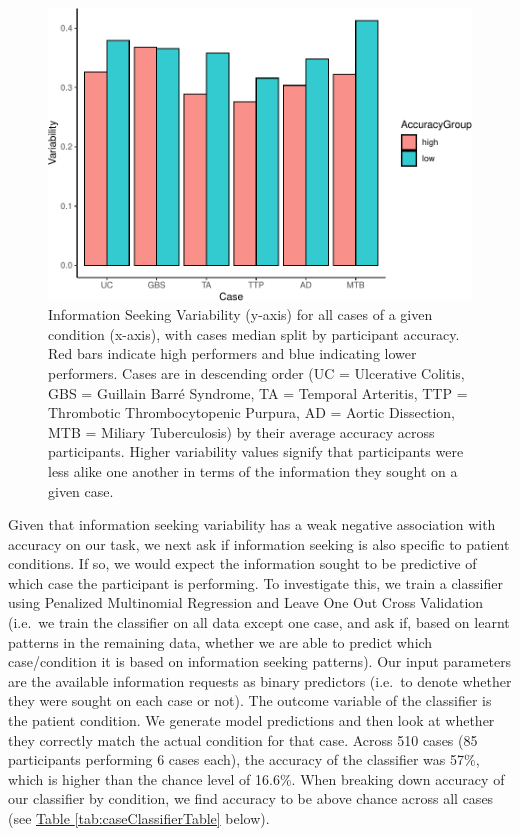 \documentclass[a4paper, nobind]{templates/ociamthesis}
\begin{document}
\begin{figure}[H]

{\centering \includegraphics[width=1\linewidth]{_main_files/figure-latex/accVarSplitPlot-1} 

}

\caption[Online Study: Information Seeking Variability Split by Accuracy and Case (Bar Graph)]{Information Seeking Variability (y-axis) for all cases of a given condition (x-axis), with cases median split by participant accuracy. Red bars indicate high performers and blue indicating lower performers. Cases are in descending order (UC = Ulcerative Colitis, GBS = Guillain Barré Syndrome, TA = Temporal Arteritis, TTP = Thrombotic Thrombocytopenic Purpura, AD = Aortic Dissection, MTB = Miliary Tuberculosis) by their average accuracy across participants. Higher variability values signify that participants were less alike one another in terms of the information they sought on a given case.}\label{fig:accVarSplitPlot}
\end{figure}

Given that information seeking variability has a weak negative association with accuracy on our task, we next ask if information seeking is also specific to patient conditions. If so, we would expect the information sought to be predictive of which case the participant is performing. To investigate this, we train a classifier using Penalized Multinomial Regression and Leave One Out Cross Validation (i.e.~we train the classifier on all data except one case, and ask if, based on learnt patterns in the remaining data, whether we are able to predict which case/condition it is based on information seeking patterns). Our input parameters are the available information requests as binary predictors (i.e.~to denote whether they were sought on each case or not). The outcome variable of the classifier is the patient condition. We generate model predictions and then look at whether they correctly match the actual condition for that case. Across 510 cases (85 participants performing 6 cases each), the accuracy of the classifier was 57\%, which is higher than the chance level of 16.6\%. When breaking down accuracy of our classifier by condition, we find accuracy to be above chance across all cases (see \hyperref[tab:caseClassifierTable]{Table \ref{tab:caseClassifierTable}} below).
\end{document}
